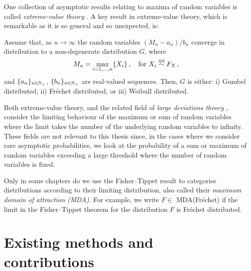 One collection of asymptotic results relating to maxima of random variables is called \emph{extreme-value theory} \cite{de2007extreme}. A key result in extreme-value theory, which is remarkable as it is so general and so unexpected, is:

\begin{theorem}

Assume that, as $n\to\infty$ the random variables $(M_n - a_n) / b_n$ converge in distribution to a non-degenerate distribution $G$, where
\[ M_n = \max_{i=1,\dots,n} \{X_i\} \,, \quad \text{for } X_i \overset{\smash{\mathrm{iid}}}{\sim} F_X \,, \]
and $\{ a_n \}_{n\in\mathbb{N}_+}$, $\{ b_n \}_{n\in\mathbb{N}_+}$ are real-valued sequences. Then, $G$ is either: i) Gumbel distributed, ii) Fr{\'e}chet distributed, or iii) Weibull distributed.

\end{theorem}

Both extreme-value theory, and the related field of \emph{large deviations theory} \cite{deuschel2001large}, consider the limiting behaviour of the maximum or sum of random variables where the limit takes the number of the underlying random variables to infinity. These fields are not relevant to this thesis since, in the cases where we consider rare asymptotic probabilities, we look at the probability of a sum or maximum of random variables exceeding a large threshold where the number of random variables is fixed.

Only in some chapters do we use the Fisher--Tippet result to categorise distributions according to their limiting distribution, also called their \emph{maximum domain of attraction (MDA)}. For example, we write $F \in$ \textsf{MDA(Fr\'echet)} if the limit in the Fisher--Tippet theorem for the distribution $F$ is Fr{\'e}chet distributed.


\section{Existing methods and contributions}

